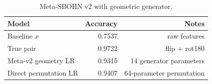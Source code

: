 \begin{table}[h]
\centering
\caption{Meta-SBOHN v2 with geometric generator.}
\begin{tabular}{l r r}
\hline
Model & Accuracy & Notes \\
\hline
Baseline \(x\) & 0.7537 & raw features \\
True pair & 0.9722 & flip + rot180 \\
Meta-v2 geometry LR & 0.9315 & 14 generator parameters \\
Direct permutation LR & 0.9407 & 64-parameter permutation \\
\hline
\end{tabular}
\end{table}
